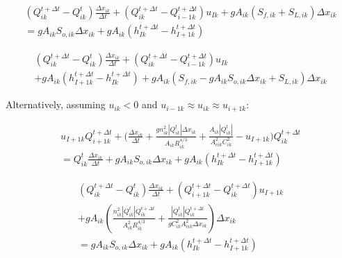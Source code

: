 \documentclass[11pt]{article}
\begin{document}
\begin{equation}
  \begin{split}
    (Q_{ik}^{t + \Delta t} - Q_{ik}^t) \frac{\Delta x_{ik}}{\Delta t} + (Q_{ik}^{t + \Delta t} - Q_{i - 1k}^{t + \Delta t}) u_{Ik} + g A_{ik} (S_{f,ik} + S_{L,ik}) \Delta x_{ik} \\ =
    g A_{ik} S_{o,ik} \Delta x_{ik} + g A_{ik} (h_{Ik}^{t + \Delta t} - h_{I+1k}^{t + \Delta t})
  \end{split}
\end{equation}

\begin{equation}
  \begin{split}
    (Q_{ik}^{t + \Delta t} - Q_{ik}^t) \frac{\Delta x_{ik}}{\Delta t} + (Q_{ik}^{t + \Delta t} - Q_{i - 1k}^{t + \Delta t}) u_{Ik} \\ + g A_{ik} (h_{I+1k}^{t + \Delta t} - h_{Ik}^{t + \Delta t}) + g A_{ik} (S_{f,ik} -
    g A_{ik} S_{o,ik} \Delta x_{ik} + S_{L,ik}) \Delta x_{ik}
  \end{split}
\end{equation}

Alternatively, assuming $u_{ik} < 0$ and $u_{i-1k} \approx u_{ik} \approx u_{i+1k}$:

\begin{equation}
  \begin{split}
    u_{I+1k} Q_{i+1k}^{t + \Delta t} + \biggl(\frac{\Delta x_{ik}}{\Delta t} + \frac{g n_{ik}^2 |Q_{ik}^t| \Delta x_{ik}}{A_{ik} R_{ik}^{4/3}} + \frac{A_{ik} |Q_{ik}^t|}{A_{cik}^2 C_{ik}^2} - u_{I+1k} \biggr) Q_{ik}^{t + \Delta t} \\ =
    Q_{ik}^t \frac{\Delta x_{ik}}{\Delta t} + g A_{ik} S_{o,ik} \Delta x_{ik} + g A_{ik} (h_{Ik}^{t + \Delta t} - h_{I+1k}^{t + \Delta t})
  \end{split}
\end{equation}

\begin{equation}
  \begin{split}
    (Q_{ik}^{t + \Delta t} - Q_{ik}^t) \frac{\Delta x_{ik}}{\Delta t} + (Q_{i+1k}^{t + \Delta t} - Q_{ik}^{t + \Delta t}) u_{I+1k} \\ + g A_{ik} (\frac{n_{ik}^2 |Q_{ik}^t| Q_{ik}^{t + \Delta t}}{A_{ik}^2 R_{ik}^{4/3}} + \frac{|Q_{ik}^t| Q_{ik}^{t + \Delta t}}{g C_{ik}^2 A_{cik}^2 \Delta x_{ik}}) \Delta x_{ik} \\ =
    g A_{ik} S_{o,ik} \Delta x_{ik} + g A_{ik} (h_{Ik}^{t + \Delta t} - h_{I+1k}^{t + \Delta t})
  \end{split}
\end{equation}
\end{document}
